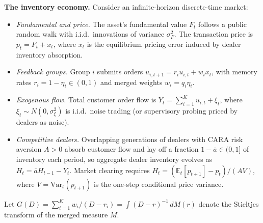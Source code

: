 \documentclass[11pt,letterpaper]{article}
\theoremstyle{definition}
\newcommand{\E}{\mathbb{E}}
\newcommand{\Var}{\mathrm{Var}}
\begin{document}
\textbf{The inventory economy.} Consider an infinite-horizon discrete-time market:
\begin{itemize}
  \item \emph{Fundamental and price.} The asset's fundamental value $F_t$ follows a public random walk with i.i.d.\ innovations of variance $\sigma_F^2$. The transaction price is $p_t = F_t + x_t$, where $x_t$ is the equilibrium pricing error induced by dealer inventory absorption.
  \item \emph{Feedback groups.} Group $i$ submits orders $u_{i,t+1} = r_i u_{i,t} + w_i x_t$, with memory rates $r_i = 1 - \eta_i \in (0, 1)$ and merged weights $w_i = q_i \eta_i$.
  \item \emph{Exogenous flow.} Total customer order flow is $Y_t = \sum_{i=1}^K u_{i,t} + \xi_t$, where $\xi_t \sim N(0, \sigma_\xi^2)$ is i.i.d.\ noise trading (or supervisory probing priced by dealers as noise).
  \item \emph{Competitive dealers.} Overlapping generations of dealers with CARA risk aversion $A > 0$ absorb customer flow and lay off a fraction $1 - \bar{a} \in (0, 1]$ of inventory each period, so aggregate dealer inventory evolves as $H_t = \bar{a} H_{t-1} - Y_t$. Market clearing requires $H_t = (\E_t[p_{t+1}] - p_t)/(A V)$, where $V = \Var_t(p_{t+1})$ is the one-step conditional price variance.
\end{itemize}
Let $G(D) = \sum_{i=1}^K w_i / (D - r_i) = \int (D - r)^{-1} \, dM(r)$ denote the Stieltjes transform of the merged measure $M$.
\end{document}
